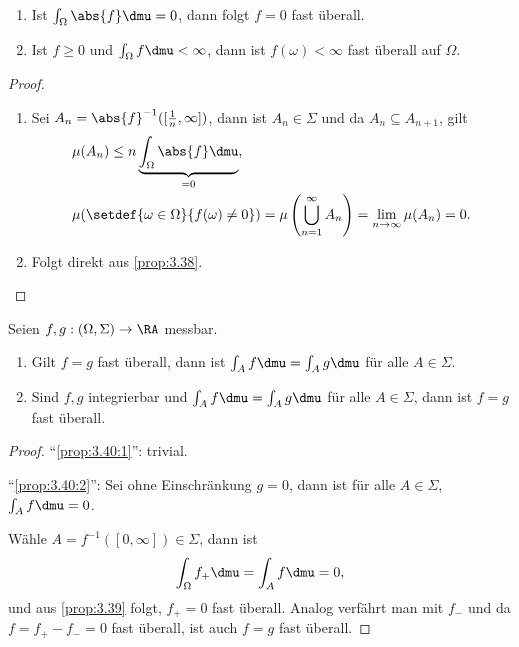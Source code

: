 \begin{cor}
\label{prop:3.39}
\begin{enumerate}[label=\arabic{*}.)]
  \item Ist $\int_\Omega \abs{f} \dmu = 0$, dann folgt $f=0$ fast überall.
  \item Ist $f\ge 0$ und $\int_\Omega f \dmu < \infty$, dann ist $f(\omega)
  <\infty$ fast überall auf $\Omega$.
\end{enumerate}
\end{cor}
\begin{proof}
\begin{enumerate}[label=\arabic{*}.)]
  \item Sei $A_n = \abs{f}^{-1}([\frac{1}{n},\infty])$, dann ist $A_n\in\Sigma$
  und da $A_n\subseteq A_{n+1}$, gilt
\begin{align*}
&\mu(A_n)\le n \underbrace{\int_\Omega \abs{f}\dmu}_{=0},\\
&\mu(\setdef{\omega\in\Omega}{f(\omega)\neq0}) = 
\mu\left(\bigcup_{n=1}^\infty A_n \right)
= \lim\limits_{n\to\infty} \mu(A_n) = 0.
\end{align*}
  \item Folgt direkt aus \ref{prop:3.38}.\qedhere
\end{enumerate}
\end{proof}

\begin{cor}
\label{prop:3.40}
Seien $f,g:(\Omega,\Sigma)\to\RA$ messbar.
\begin{enumerate}[label=(\roman{*})]
\item\label{prop:3.40:1}
Gilt $f=g$ fast überall, dann ist $\int_A f\dmu = \int_A g\dmu$ für alle
$A\in\Sigma$.
\item\label{prop:3.40:2}
Sind $f,g$ integrierbar und $\int_A f\dmu = \int_A g\dmu$ für alle
$A\in\Sigma$, dann ist $f=g$ fast überall.\fishhere 
\end{enumerate}
\end{cor}
\begin{proof}
``\ref{prop:3.40:1}'': trivial.

``\ref{prop:3.40:2}'': Sei ohne Einschränkung $g = 0$, dann ist für alle
$A\in\Sigma$, $\int_A f\dmu = 0$.

Wähle $A=f^{-1}([0,\infty])\in\Sigma$, dann ist
\begin{align*}
\int_\Omega f_+ \dmu = \int_A f \dmu = 0,
\end{align*}
und aus \ref{prop:3.39} folgt, $f_+ = 0$ fast überall. Analog verfährt man mit
$f_-$ und da $f = f_+-f_- = 0$ fast überall, ist auch $f=g$ fast
überall.\qedhere
\end{proof}

